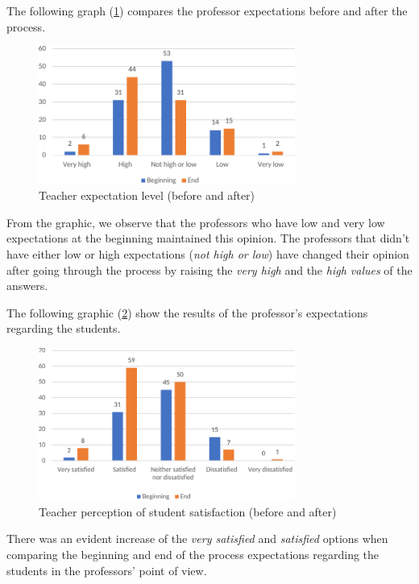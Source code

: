 \documentclass[english]{textolivre}
\begin{document}
The following graph (\ref{fig3}) compares the professor expectations before and after the process.

\begin{figure}[htbp]
 \centering
 \includegraphics[width=0.75\textwidth]{Fig_003.pdf}
 \caption{Teacher expectation level (before and after)}
 \label{fig3}
\end{figure}

From the graphic, we observe that the professors who have low and very low expectations at the beginning maintained this opinion. The professors that didn't have either low or high expectations (\emph{not high or low}) have changed their opinion after going through the process by raising the \emph{very high} and the \emph{high values} of the answers. 

The following graphic (\ref{fig4}) show the results of the professor's expectations regarding the students.

\begin{figure}[htbp]
 \centering
 \includegraphics[width=0.75\textwidth]{Fig_004.pdf}
 \caption{Teacher perception of student satisfaction (before and after)}
 \label{fig4}
\end{figure}

There was an evident increase of the \emph{very satisfied} and \emph{satisfied} options when comparing the beginning and end of the process expectations regarding the students in the professors' point of view. 
\end{document}
